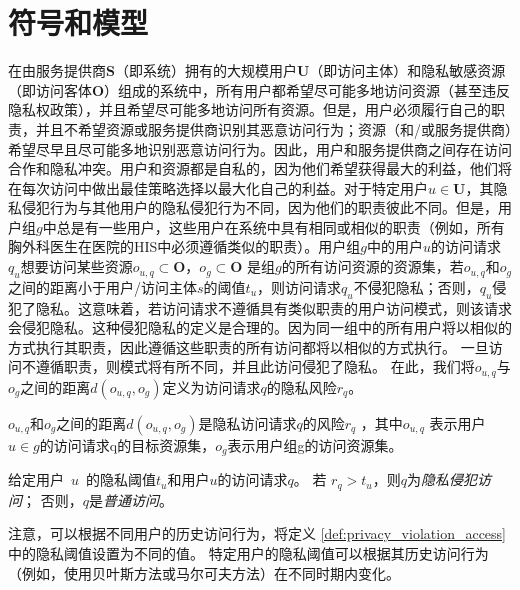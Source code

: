 \section{符号和模型}
\label{sec:notations}


在由服务提供商$\mathbf{S}$（即系统）拥有的大规模用户$\mathbf{U}$（即访问主体）和隐私敏感资源（即访问客体$\mathbf{O}$）组成的系统中，所有用户都希望尽可能多地访问资源（甚至违反隐私权政策），并且希望尽可能多地访问所有资源。但是，用户必须履行自己的职责，并且不希望资源或服务提供商识别其恶意访问行为；资源（和/或服务提供商）希望尽早且尽可能多地识别恶意访问行为。因此，用户和服务提供商之间存在访问合作和隐私冲突。用户和资源都是自私的，因为他们希望获得最大的利益，他们将在每次访问中做出最佳策略选择以最大化自己的利益。对于特定用户$u \in \mathbf{U}$，其隐私侵犯行为与其他用户的隐私侵犯行为不同，因为他们的职责彼此不同。但是，用户组$g$中总是有一些用户，这些用户在系统中具有相同或相似的职责（例如，所有胸外科医生在医院的HIS中必须遵循类似的职责）。用户组$g$中的用户$u$的访问请求$q_u$想要访问某些资源$o_{u,q} \subset \mathbf{O}$，$o_{g} \subset \mathbf{O}$ 是组$g$的所有访问资源的资源集，若$o_{u,q}$和$o_{g}$之间的距离小于用户/访问主体$s$的阈值$t_u$，则访问请求$q_u$不侵犯隐私；否则，$q_u$侵犯了隐私。这意味着，若访问请求不遵循具有类似职责的用户访问模式，则该请求会侵犯隐私。这种侵犯隐私的定义是合理的。因为同一组中的所有用户将以相似的方式执行其职责，因此遵循这些职责的所有访问都将以相似的方式执行。 一旦访问不遵循职责，则模式将有所不同，并且此访问侵犯了隐私。 在此，我们将$o_{u,q}$与$o_{g}$之间的距离$d(o_{u,q},o_{g})$定义为访问请求$q$的隐私风险$r_q$。
\begin{definition}
	\label{def:privacy_risk}
	$o_{u,q}$和$o_{g}$之间的距离$d(o_{u,q},o_{g})$是隐私访问请求$q$的风险$r_q$ ，其中$o_{u,q}$ 表示用户$u \in g$的访问请求q的目标资源集，$o_{g}$表示用户组g的访问资源集。
\end{definition}

\begin{definition}
	\label{def:privacy_violation_access}
	
	给定用户~$u$~的隐私阈值$t_u$和用户$u$的访问请求$q$。 若 $r_q > t_u$，则$q$为\textit{隐私侵犯访问}； 否则，$q$是\textit{普通访问}。
\end{definition}



注意，可以根据不同用户的历史访问行为，将定义 \ref{def:privacy_violation_access}中的隐私阈值设置为不同的值。 特定用户的隐私阈值可以根据其历史访问行为（例如，使用贝叶斯方法或马尔可夫方法）在不同时期内变化。

